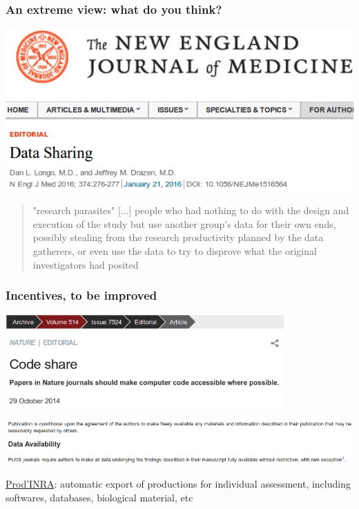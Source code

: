 \documentclass[c]{beamer} %
\begin{document}
\begin{frame}
  \frametitle{An extreme view: what do you think?}
  \begin{center}
    \includegraphics[width=\textwidth,height=0.40\textheight,keepaspectratio=true]{2016-01_LongoDrazen_title}%
  \end{center}

  \begin{quote}
    "research parasites" [...] people who had nothing to do with the design and execution of the study but use another group’s data for their own ends, possibly stealing from the research productivity planned by the data gatherers, or even use the data to try to disprove what the original investigators had posited
  \end{quote}
\end{frame}

\begin{frame}
  \frametitle{Incentives, to be improved}
  \begin{center}
    \includegraphics[width=0.8\textwidth,height=0.90\textheight,keepaspectratio=true]{2014-10_Nature_code-share}%
  \end{center}
  
  \begin{center}
    \includegraphics[width=1\textwidth,height=1.2\textheight,keepaspectratio=true]{2014-10_PLoS_data-availability}%
  \end{center}
  
  \bigskip
  \pause
  
  \href{http://prodinra.inra.fr/?locale=en}{Prod'INRA}: automatic export of productions for individual assessment, including softwares, databases, biological material, etc
\end{frame}
\end{document}
